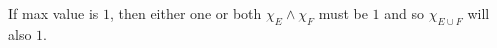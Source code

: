 \documentclass[preview]{standalone}
\begin{document}
\begin{center}
If max value is $1$, then either one or both $\chi_E \land \chi_F$ must be $1$ and so $\chi_{E \cup F}$ will also $1$.
\end{center}
\end{document}
